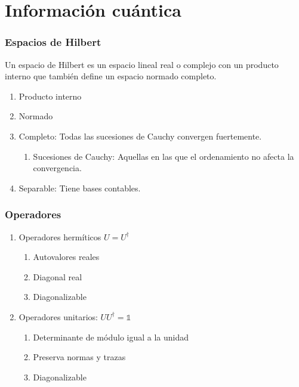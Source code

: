 \documentclass[xetex,mathserif,serif]{beamer}
\begin{document}
\section{Información cuántica}

\begin{frame}
    \frametitle{Espacios de Hilbert}

    Un espacio de Hilbert es un espacio lineal real o complejo con un producto interno que también define un espacio normado completo.

    \begin{enumerate}
        \item Producto interno
        \item Normado
        \item Completo: Todas las sucesiones de Cauchy convergen fuertemente.
            \begin{enumerate}
                \item Sucesiones de Cauchy: Aquellas en las que el ordenamiento no afecta la convergencia.
            \end{enumerate}
        \item Separable: Tiene bases contables.
    \end{enumerate}

\end{frame}

\begin{frame}
    \frametitle{Operadores}

    \begin{enumerate}
        \item Operadores hermíticos $U = U^\dagger$
            \begin{enumerate}
                \item Autovalores reales
                \item Diagonal real
                \item Diagonalizable
            \end{enumerate}

        \item Operadores unitarios: $U U^\dagger = \mathds{1}$
            \begin{enumerate}
                \item Determinante de módulo igual a la unidad
                \item Preserva normas y trazas
                \item Diagonalizable
            \end{enumerate}
    \end{enumerate}

\end{frame}
\end{document}
